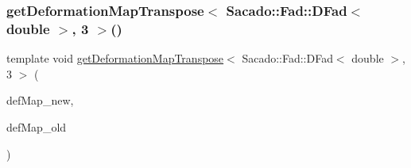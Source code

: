 \mbox{\label{function_evaluations_8cc_afa134cc0a430399a7c20d2d82dd652bb}} 
\subsubsection{\texorpdfstring{get\+Deformation\+Map\+Transpose$<$ Sacado\+::\+Fad\+::\+D\+Fad$<$ double $>$, 3 $>$()}{getDeformationMapTranspose< Sacado::Fad::DFad< double >, 3 >()}}
{\footnotesize\ttfamily template void \mbox{\hyperlink{group___evaluation_functions_gad4003712a2346a79e13bdbfcad4d1e1c}{get\+Deformation\+Map\+Transpose}}$<$ Sacado\+::\+Fad\+::\+D\+Fad$<$ double $>$, 3 $>$ (\begin{DoxyParamCaption}\item[{\mbox{\hyperlink{structdeformation_map}{deformation\+Map}}$<$ Sacado\+::\+Fad\+::\+D\+Fad$<$ double $>$, 3 $>$ \&}]{def\+Map\+\_\+new,  }\item[{\mbox{\hyperlink{structdeformation_map}{deformation\+Map}}$<$ Sacado\+::\+Fad\+::\+D\+Fad$<$ double $>$, 3 $>$ \&}]{def\+Map\+\_\+old }\end{DoxyParamCaption})}

